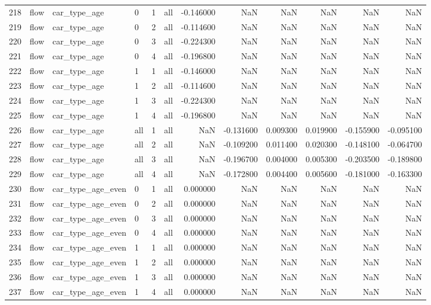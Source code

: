 \begin{tabular}{llllllrrrrrr}
218 & flow & car_type_age & 0 & 1 & all & -0.146000 & NaN & NaN & NaN & NaN & NaN \\
219 & flow & car_type_age & 0 & 2 & all & -0.114600 & NaN & NaN & NaN & NaN & NaN \\
220 & flow & car_type_age & 0 & 3 & all & -0.224300 & NaN & NaN & NaN & NaN & NaN \\
221 & flow & car_type_age & 0 & 4 & all & -0.196800 & NaN & NaN & NaN & NaN & NaN \\
222 & flow & car_type_age & 1 & 1 & all & -0.146000 & NaN & NaN & NaN & NaN & NaN \\
223 & flow & car_type_age & 1 & 2 & all & -0.114600 & NaN & NaN & NaN & NaN & NaN \\
224 & flow & car_type_age & 1 & 3 & all & -0.224300 & NaN & NaN & NaN & NaN & NaN \\
225 & flow & car_type_age & 1 & 4 & all & -0.196800 & NaN & NaN & NaN & NaN & NaN \\
226 & flow & car_type_age & all & 1 & all & NaN & -0.131600 & 0.009300 & 0.019900 & -0.155900 & -0.095100 \\
227 & flow & car_type_age & all & 2 & all & NaN & -0.109200 & 0.011400 & 0.020300 & -0.148100 & -0.064700 \\
228 & flow & car_type_age & all & 3 & all & NaN & -0.196700 & 0.004000 & 0.005300 & -0.203500 & -0.189800 \\
229 & flow & car_type_age & all & 4 & all & NaN & -0.172800 & 0.004400 & 0.005600 & -0.181000 & -0.163300 \\
230 & flow & car_type_age_even & 0 & 1 & all & 0.000000 & NaN & NaN & NaN & NaN & NaN \\
231 & flow & car_type_age_even & 0 & 2 & all & 0.000000 & NaN & NaN & NaN & NaN & NaN \\
232 & flow & car_type_age_even & 0 & 3 & all & 0.000000 & NaN & NaN & NaN & NaN & NaN \\
233 & flow & car_type_age_even & 0 & 4 & all & 0.000000 & NaN & NaN & NaN & NaN & NaN \\
234 & flow & car_type_age_even & 1 & 1 & all & 0.000000 & NaN & NaN & NaN & NaN & NaN \\
235 & flow & car_type_age_even & 1 & 2 & all & 0.000000 & NaN & NaN & NaN & NaN & NaN \\
236 & flow & car_type_age_even & 1 & 3 & all & 0.000000 & NaN & NaN & NaN & NaN & NaN \\
237 & flow & car_type_age_even & 1 & 4 & all & 0.000000 & NaN & NaN & NaN & NaN & NaN \\

\end{tabular}
